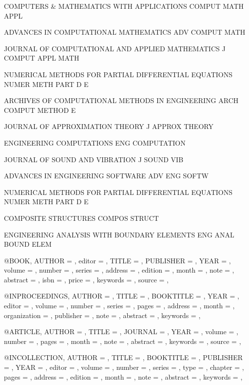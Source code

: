 {COMPUTERS & MATHEMATICS WITH APPLICATIONS
    COMPUT MATH APPL

ADVANCES IN COMPUTATIONAL MATHEMATICS
    ADV COMPUT MATH

JOURNAL OF COMPUTATIONAL AND APPLIED MATHEMATICS
    J COMPUT APPL MATH

NUMERICAL METHODS FOR PARTIAL DIFFERENTIAL EQUATIONS
    NUMER METH PART D E

ARCHIVES OF COMPUTATIONAL METHODS IN ENGINEERING
    ARCH COMPUT METHOD E

JOURNAL OF APPROXIMATION THEORY
    J APPROX THEORY

ENGINEERING COMPUTATIONS
    ENG COMPUTATION

JOURNAL OF SOUND AND VIBRATION
    J SOUND VIB

ADVANCES IN ENGINEERING SOFTWARE
    ADV ENG SOFTW

NUMERICAL METHODS FOR PARTIAL DIFFERENTIAL EQUATIONS
    NUMER METH PART D E

COMPOSITE STRUCTURES
    COMPOS STRUCT

ENGINEERING ANALYSIS WITH BOUNDARY ELEMENTS
    ENG ANAL BOUND ELEM





@BOOK{,
  AUTHOR =       {},
  editor =       {},
  TITLE =        {},
  PUBLISHER =    {},
  YEAR =         {},
  volume =       {},
  number =       {},
  series =       {},
  address =      {},
  edition =      {},
  month =        {},
  note =         {},
  abstract =     {},
  isbn =         {},
  price =        {},
  keywords =     {},
  source =       {},
}

@INPROCEEDINGS{,
  AUTHOR =       {},
  TITLE =        {},
  BOOKTITLE =    {},
  YEAR =         {},
  editor =       {},
  volume =       {},
  number =       {},
  series =       {},
  pages =        {},
  address =      {},
  month =        {},
  organization = {},
  publisher =    {},
  note =         {},
  abstract =     {},
  keywords =     {},
}

@ARTICLE{,
  AUTHOR =       {},
  TITLE =        {},
  JOURNAL =      {},
  YEAR =         {},
  volume =       {},
  number =       {},
  pages =        {},
  month =        {},
  note =         {},
  abstract =     {},
  keywords =     {},
  source =       {},
}

@INCOLLECTION{,
  AUTHOR =       {},
  TITLE =        {},
  BOOKTITLE =    {},
  PUBLISHER =    {},
  YEAR =         {},
  editor =       {},
  volume =       {},
  number =       {},
  series =       {},
  type =         {},
  chapter =      {},
  pages =        {},
  address =      {},
  edition =      {},
  month =        {},
  note =         {},
  abstract =     {},
  keywords =     {},
}


}
